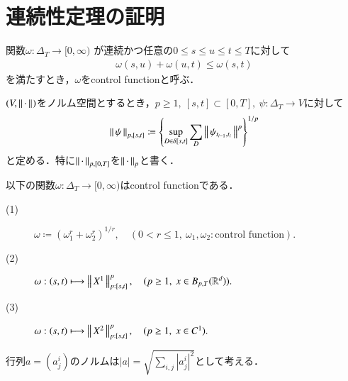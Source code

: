 \section{連続性定理の証明}
	\begin{screen}
		\begin{dfn}
			関数$\omega:\Delta_T \longrightarrow [0,\infty)$
			が連続かつ任意の$0 \leq s \leq u \leq t \leq T$に対して
			\begin{align}
				\omega(s,u) + \omega(u,t) \leq \omega(s,t)
				\label{eq:control_function_subadditivity}
			\end{align}
			を満たすとき，$\omega$をcontrol functionと呼ぶ．
		\end{dfn}
	\end{screen}
	
	\begin{screen}
		\begin{dfn}
			$(V,\left\|\, \cdot\, \right\|_{})$をノルム空間とするとき，$p \geq 1,\ [s,t] \subset [0,T]
			,\ \psi:\Delta_T \longrightarrow V$に対して
			\begin{align}
				\left\|\, \psi\, \right\|_{p,[s,t]}
				\coloneqq \left\{ \operatorname*{sup}_{D \in \delta[s,t]}  \sum_D \left\|\, \psi_{t_{i-1},t_i}\, \right\|_{}^p \right\}^{1/p}
			\end{align}
			と定める．特に$\left\|\, \cdot\, \right\|_{p,[0,T]}$を$\left\|\, \cdot\, \right\|_{p}$と書く．
		\end{dfn}
	\end{screen}
	
	\begin{screen}
		\begin{thm}\label{thm:examples_of_control_functions}
			以下の関数$\omega:\Delta_T \longrightarrow [0,\infty)$はcontrol functionである．
			\begin{description}
				\item[(1)] $\omega \coloneqq \left( \omega_1^r + \omega_2^r \right)^{1/r},
					\quad (0 < r \leq 1,\ \omega_1,\omega_2:\mbox{control function}).$
				\item[(2)] $\omega:(s,t) \longmapsto \left\|\, X^1\, \right\|_{p:[s,t]}^p,
					\quad (p \geq 1,\ x \in B_{p,T}(\mathbb{R}^d)).$
				\item[(3)] $\omega:(s,t) \longmapsto \left\|\, X^2\, \right\|_{p:[s,t]}^p,
					\quad (p \geq 1,\ x \in C^1).$
			\end{description}
		\end{thm}
	\end{screen}
	
	行列$a = (a_j^i)$のノルムは$|a| = \sqrt{\sum_{i,j}|a_j^i|^2}$として考える．
	

